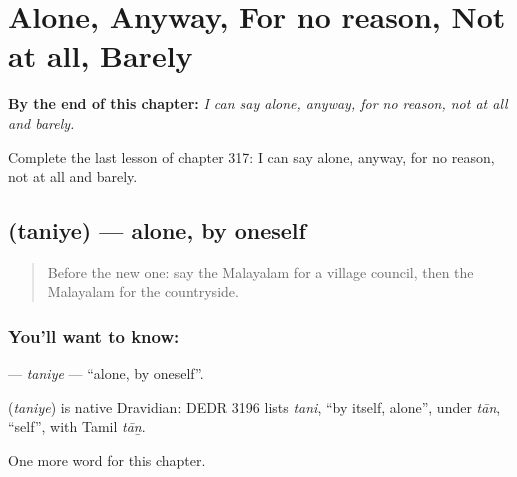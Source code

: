 
\chapter{Alone, Anyway, For no reason, Not at all, Barely}
\label{ch:ml-alone-anyway-for-no-reason-not-at-all-barely}

\begin{chapteropening}
\textbf{By the end of this chapter:} \emph{I can say alone, anyway, for no reason, not at all and barely.}

Complete the last lesson of chapter 317: I can say alone, anyway, for no reason, not at all and barely.
\end{chapteropening}

\section[\texorpdfstring{\ml{തനിയെ} (taniye)}{തനിയെ (taniye)}]{ (taniye) — alone, by oneself}

\label{lesson:ML-C317-taniye}



\begin{quote}
Before the new one: say the Malayalam for a village council, then the Malayalam for the countryside.
\end{quote}

\subsection*{You'll want to know: }
\textbf{} — \emph{taniye} — \textquotedblleft{}alone, by oneself\textquotedblright{}.

\begin{cousinweb}
\textbf{} (\emph{taniye}) is native Dravidian: DEDR 3196 lists \emph{tani}, \textquotedblleft{}by itself, alone\textquotedblright{}, under \emph{tān}, \textquotedblleft{}self\textquotedblright{}, with Tamil \emph{tāṉ}.
\end{cousinweb}

\begin{grammarlens}[title={What you've built}]
One more word for this chapter.
\end{grammarlens}

